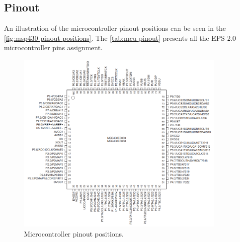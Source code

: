 \subsection{Pinout}

An illustration of the microcontroller pinout positions can be seen in the \autoref{fig:msp430-pinout-positions}. The \autoref{tab:mcu-pinout} presents all the EPS 2.0 microcontroller pins assignment.

\begin{figure}[!ht]
    \begin{center}
        \includegraphics[width=0.9\textwidth]{figures/msp430-pinout.png}
        \caption{Microcontroller pinout positions.}
        \label{fig:msp430-pinout-positions}
    \end{center}
\end{figure}

